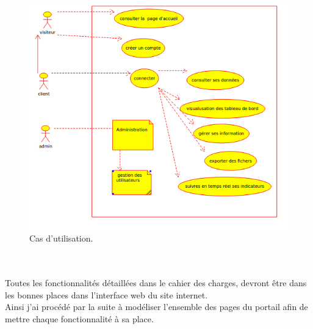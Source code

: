 \documentclass[12pt]{article}
\begin{document}
\begin{center}
\begin{figure}[htp]
  \centering
  \includegraphics[width=12cm]{cd2.png}
  \caption{Cas d'utilisation.}
  \label{fig:une-autre-image}
\end{figure}

\end{center}


\\
\\

Toutes les fonctionnalités détaillées dans le cahier des charges, devront être dans les bonnes places dans l'interface web du site internet.\\
Ainsi j'ai procédé par la suite à modéliser l'ensemble des pages du portail afin de mettre chaque 
fonctionnalité à sa place.\\
\end{document}

